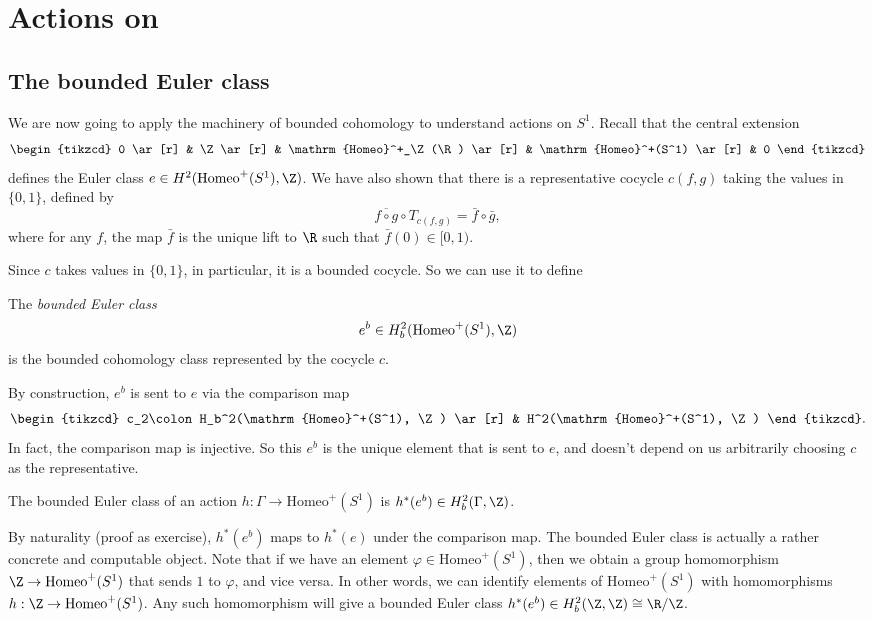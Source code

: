 \documentclass[a4paper]{article}
\newcommand\Homeo{\mathrm{Homeo}}
\begin{document}
\section{Actions on }
\subsection{The bounded Euler class}
We are now going to apply the machinery of bounded cohomology to understand actions on $S^1$. Recall that the central extension
\[
  \begin{tikzcd}
    0 \ar[r] & \Z \ar[r] & \Homeo^+_\Z(\R) \ar[r] & \Homeo^+(S^1) \ar[r] & 0
  \end{tikzcd}
\]
defines the Euler class $e \in H^2(\Homeo^+(S^1), \Z)$. We have also shown that there is a representative cocycle $c(f, g)$ taking the values in $\{0, 1\}$, defined by
\[
  \overline{f \circ g} \circ T_{c(f, g)} = \bar{f} \circ \bar{g},
\]
where for any $f$, the map $\bar{f}$ is the unique lift to $\R$ such that $\bar{f}(0) \in [0, 1)$.

Since $c$ takes values in $\{0, 1\}$, in particular, it is a bounded cocycle. So we can use it to define
\begin{defi}
  The \emph{bounded Euler class}
  \[
    e^b \in H_b^2(\Homeo^+(S^1), \Z)
  \]
  is the bounded cohomology class represented by the cocycle $c$.
\end{defi}

By construction, $e^b$ is sent to $e$ via the comparison map
\[
  \begin{tikzcd}
    c_2\colon H_b^2(\Homeo^+(S^1), \Z) \ar[r] & H^2(\Homeo^+(S^1), \Z)
  \end{tikzcd}.
\]
In fact, the comparison map is injective. So this $e^b$ is the unique element that is sent to $e$, and doesn't depend on us arbitrarily choosing $c$ as the representative.

\begin{defi}
  The bounded Euler class of an action $h\colon \Gamma \to \Homeo^+(S^1)$ is $h^*(e^b) \in H_b^2(\Gamma, \Z)$.
\end{defi}

By naturality (proof as exercise), $h^*(e^b)$ maps to $h^*(e)$ under the comparison map. The bounded Euler class is actually a rather concrete and computable object. Note that if we have an element $\varphi \in \Homeo^+(S^1)$, then we obtain a group homomorphism $\Z \to \Homeo^+(S^1)$ that sends $1$ to $\varphi$, and vice versa. In other words, we can identify elements of $\Homeo^+(S^1)$ with homomorphisms $h: \Z \to \Homeo^+(S^1)$. Any such homomorphism will give a bounded Euler class $h^*(e^b) \in H_b^2(\Z, \Z) \cong \R/\Z$.
\end{document}
